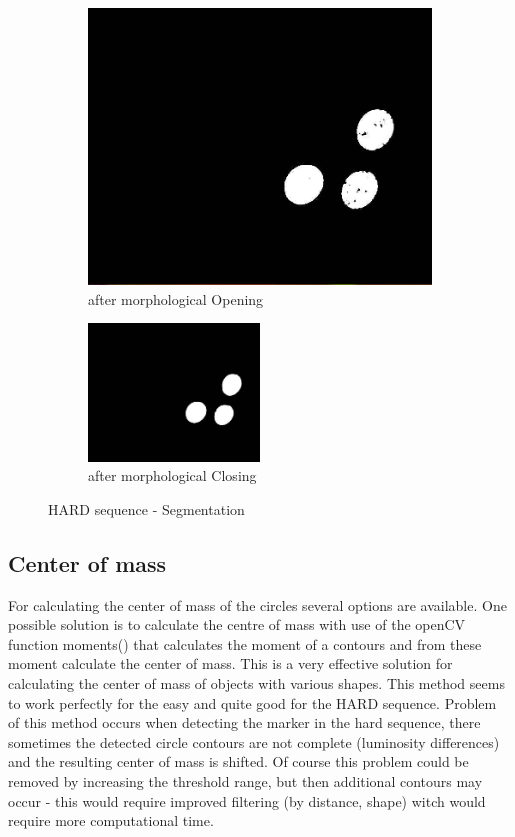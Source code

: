 \begin{figure}[ht!]
\begin{subfigure}{.49\textwidth}
		\includegraphics[width=\textwidth]{figures/color3}
	\caption{after morphological Opening}
	\label{fig:c3}
	\end{subfigure}
	\begin{subfigure}{\textwidth}
		\centering
\includegraphics[width=0.5\textwidth]{figures/color4}
	\caption{after morphological Closing}
	\label{fig:c4}
	\end{subfigure}
\caption{HARD sequence - Segmentation}
\label{fig:markerColorSegmenation}
\end{figure}

\subsection{Center of mass}
For calculating the center of mass of the circles several options are available.
One possible solution is to calculate the centre of mass with use of the openCV function
moments() that calculates the moment of a contours and from these moment calculate the
center of mass. This is a very effective solution for calculating the center of mass of
objects with various shapes. This method seems to work perfectly for the easy and quite good
for the HARD sequence. Problem of this method occurs when detecting the marker in the hard sequence,
there sometimes the detected circle contours are not complete (luminosity differences) and the resulting
center of mass is shifted. Of course this problem could be removed by increasing the threshold range, but
then additional contours may occur - this would require improved filtering (by distance, shape) witch would
require more computational time. 



